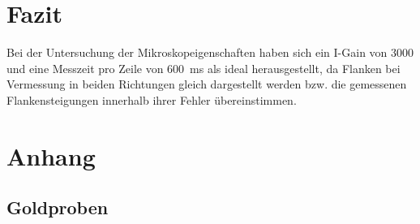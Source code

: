 \documentclass[12pt,a4paper]{article}
\begin{document}
\section{Fazit}
Bei der Untersuchung der Mikroskopeigenschaften haben sich ein I-Gain von 3000 und eine Messzeit pro Zeile von \SI{600}{ms} als ideal herausgestellt, da Flanken bei Vermessung in beiden Richtungen gleich dargestellt werden bzw. die gemessenen Flankensteigungen innerhalb ihrer Fehler übereinstimmen.\\


\newpage
\section{Anhang}
\subsection{Goldproben}
\end{document}
